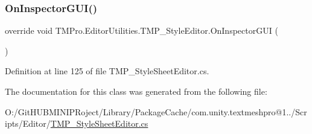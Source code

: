 \subsubsection{\texorpdfstring{OnInspectorGUI()}{OnInspectorGUI()}}
{\footnotesize\ttfamily override void T\+M\+Pro.\+Editor\+Utilities.\+T\+M\+P\+\_\+\+Style\+Editor.\+On\+Inspector\+G\+UI (\begin{DoxyParamCaption}{ }\end{DoxyParamCaption})}



Definition at line 125 of file T\+M\+P\+\_\+\+Style\+Sheet\+Editor.\+cs.



The documentation for this class was generated from the following file\+:\begin{DoxyCompactItemize}
\item 
O\+:/\+Git\+H\+U\+B\+M\+I\+N\+I\+P\+Roject/\+Library/\+Package\+Cache/com.\+unity.\+textmeshpro@1../\+Scripts/\+Editor/\mbox{\hyperlink{_t_m_p___style_sheet_editor_8cs}{T\+M\+P\+\_\+\+Style\+Sheet\+Editor.\+cs}}\end{DoxyCompactItemize}
